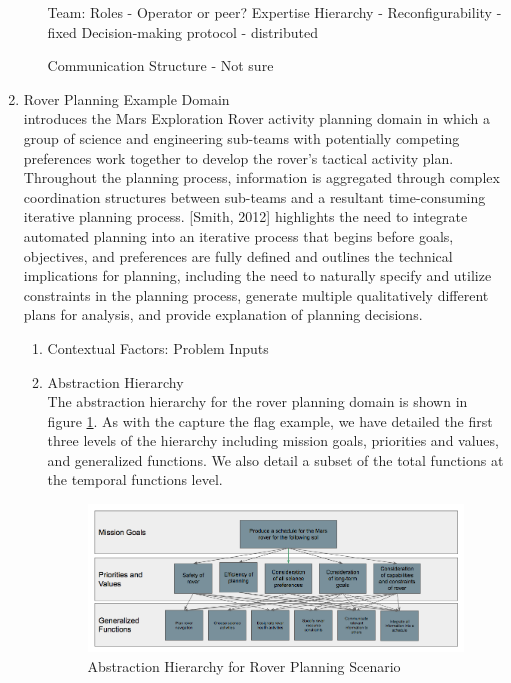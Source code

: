 \documentclass[letterpaper, 10 pt, conference]{ieeeconf}  %
\theoremstyle{definition}
\begin{document}
\begin{enumerate}
\begin{enumerate}
	Team:
		Roles - Operator or peer?
		Expertise Hierarchy -
			Reconfigurability - fixed
			Decision-making protocol - distributed

		Communication Structure - Not sure


\end{enumerate}


\item Rover Planning Example Domain
\\[Smith, 2012] introduces the Mars Exploration Rover activity planning domain in which a group of science and engineering sub-teams with potentially competing preferences work together to develop the rover’s tactical activity plan. Throughout the planning process, information is aggregated through complex coordination structures between sub-teams and a resultant time-consuming iterative planning process. [Smith, 2012] highlights the need to integrate automated planning into an iterative process that begins before goals, objectives, and preferences are fully defined and outlines the technical implications for planning, including the need to naturally specify and utilize constraints in the planning process, generate multiple qualitatively different plans for analysis, and provide explanation of planning decisions.

\begin{enumerate}
    \item Contextual Factors: Problem Inputs
    \item Abstraction Hierarchy
    \\The abstraction hierarchy for the rover planning domain is shown in figure \ref{fig:rpah}. As with the capture the flag example, we have detailed the first three levels of the hierarchy including mission goals, priorities and values, and generalized functions. We also detail a subset of the total functions at the temporal functions level. %
    
       \begin{figure}[tb]
    \centering
    \includegraphics[width=\columnwidth]{rpAH.png}
   \caption{Abstraction Hierarchy for Rover Planning Scenario}
    \label{fig:rpah}
    \end{figure}
    

\end{enumerate}
\end{enumerate}
\end{document}
